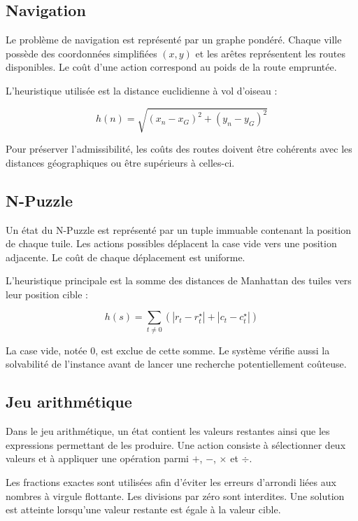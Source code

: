 \subsection{Navigation}

Le problème de navigation est représenté par un graphe pondéré. Chaque ville
possède des coordonnées simplifiées $(x,y)$ et les arêtes représentent les
routes disponibles. Le coût d'une action correspond au poids de la route
empruntée.

L'heuristique utilisée est la distance euclidienne à vol d'oiseau :

\[
h(n) =
\sqrt{(x_n-x_G)^2 + (y_n-y_G)^2}
\]

Pour préserver l'admissibilité, les coûts des routes doivent être cohérents
avec les distances géographiques ou être supérieurs à celles-ci.

\subsection{N-Puzzle}

Un état du N-Puzzle est représenté par un tuple immuable contenant la position
de chaque tuile. Les actions possibles déplacent la case vide vers une position
adjacente. Le coût de chaque déplacement est uniforme.

L'heuristique principale est la somme des distances de Manhattan des tuiles
vers leur position cible :

\[
h(s) = \sum_{t \neq 0}
\left(
|r_t-r_t^\star| + |c_t-c_t^\star|
\right)
\]

La case vide, notée $0$, est exclue de cette somme. Le système vérifie aussi
la solvabilité de l'instance avant de lancer une recherche potentiellement
coûteuse.

\subsection{Jeu arithmétique}

Dans le jeu arithmétique, un état contient les valeurs restantes ainsi que les
expressions permettant de les produire. Une action consiste à sélectionner deux
valeurs et à appliquer une opération parmi $+$, $-$, $\times$ et $\div$.

Les fractions exactes sont utilisées afin d'éviter les erreurs d'arrondi liées
aux nombres à virgule flottante. Les divisions par zéro sont interdites. Une
solution est atteinte lorsqu'une valeur restante est égale à la valeur cible.
